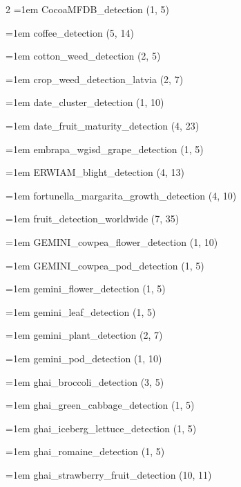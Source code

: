 \begin{multicols}{2}
\hangindent=1em CocoaMFDB\_\allowbreak{}detection (1, 5)\par
\hangindent=1em coffee\_\allowbreak{}detection (5, 14)\par
\hangindent=1em cotton\_\allowbreak{}weed\_\allowbreak{}detection (2, 5)\par
\hangindent=1em crop\_\allowbreak{}weed\_\allowbreak{}detection\_\allowbreak{}latvia (2, 7)\par
\hangindent=1em date\_\allowbreak{}cluster\_\allowbreak{}detection (1, 10)\par
\hangindent=1em date\_\allowbreak{}fruit\_\allowbreak{}maturity\_\allowbreak{}detection (4, 23)\par
\hangindent=1em embrapa\_\allowbreak{}wgisd\_\allowbreak{}grape\_\allowbreak{}detection (1, 5)\par
\hangindent=1em ERWIAM\_\allowbreak{}blight\_\allowbreak{}detection (4, 13)\par
\hangindent=1em fortunella\_\allowbreak{}margarita\_\allowbreak{}growth\_\allowbreak{}detection (4, 10)\par
\hangindent=1em fruit\_\allowbreak{}detection\_\allowbreak{}worldwide (7, 35)\par
\hangindent=1em GEMINI\_\allowbreak{}cowpea\_\allowbreak{}flower\_\allowbreak{}detection (1, 10)\par
\hangindent=1em GEMINI\_\allowbreak{}cowpea\_\allowbreak{}pod\_\allowbreak{}detection (1, 5)\par
\hangindent=1em gemini\_\allowbreak{}flower\_\allowbreak{}detection (1, 5)\par
\hangindent=1em gemini\_\allowbreak{}leaf\_\allowbreak{}detection (1, 5)\par
\hangindent=1em gemini\_\allowbreak{}plant\_\allowbreak{}detection (2, 7)\par
\hangindent=1em gemini\_\allowbreak{}pod\_\allowbreak{}detection (1, 10)\par
\hangindent=1em ghai\_\allowbreak{}broccoli\_\allowbreak{}detection (3, 5)\par
\hangindent=1em ghai\_\allowbreak{}green\_\allowbreak{}cabbage\_\allowbreak{}detection (1, 5)\par
\hangindent=1em ghai\_\allowbreak{}iceberg\_\allowbreak{}lettuce\_\allowbreak{}detection (1, 5)\par
\hangindent=1em ghai\_\allowbreak{}romaine\_\allowbreak{}detection (1, 5)\par
\hangindent=1em ghai\_\allowbreak{}strawberry\_\allowbreak{}fruit\_\allowbreak{}detection (10, 11)\par

\end{multicols}
